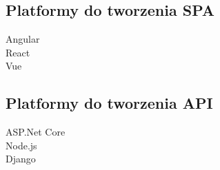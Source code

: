 	\subsection{Platformy do tworzenia SPA}
		\begin{description}
			\item[Angular]
			\item[React] 
			\item[Vue] 
		\end{description}

	\subsection{Platformy do tworzenia API}
		\begin{description}
			\item[ASP.Net Core]
			\item[Node.js] 
			\item[Django] 
		\end{description}